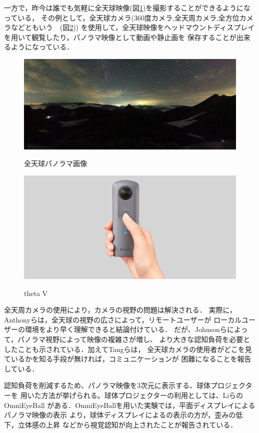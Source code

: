 一方で，昨今は誰でも気軽に全天球映像(図\ref{fig:2})を撮影することができるようになっている，
その例として，全天球カメラ(360度カメラ,全天周カメラ,全方位カメラなどともいう　(図\ref{fig:3}))
を使用して，全天球映像をヘッドマウントディスプレイを用いて観覧したり，パノラマ映像として動画や静止画を
保存することが出来るようになっている．
\begin{figure}[tp]
  \centering
  \includegraphics[scale=0.6]{fig/panorama.png}
  \caption{全天球パノラマ画像}\label{fig:2}\cite{4}
\end{figure}
\begin{figure}[tp]
  \centering
  \includegraphics[scale=0.2]{fig/thetaV.png}
  \caption{theta V}\label{fig:3}\cite{4}
\end{figure}

全天周カメラの使用により，カメラの視野の問題は解決される．
実際に，Anthonyら\cite{5}は，全天球の視野の広さによって，リモートユーザーが
ローカルユーザーの環境をより早く理解できると結論付けている．
だが、Johnsonら\cite{6}によって，パノラマ視野によって映像の複雑さが増し、
より大きな認知負荷を必要としたことも示されている．加えてTangら\cite{19}は，
全天球カメラの使用者がどこを見ているかを知る手段が無ければ，コミュニケーションが
困難になることを報告している．

認知負荷を削減するため、パノラマ映像を3次元に表示する、球体プロジェクター\cite{15}を
用いた方法が挙げられる。球体プロジェクターの利用としては、LiらのOmniEyeBall\cite{18}\cite{24}
がある．OmniEyeBallを用いた実験では，平面ディスプレイによるパノラマ映像の表示
より，球体ディスプレイによるの表示の方が，歪みの低下，立体感の上昇
などから視覚認知が向上されたことが報告されている．

